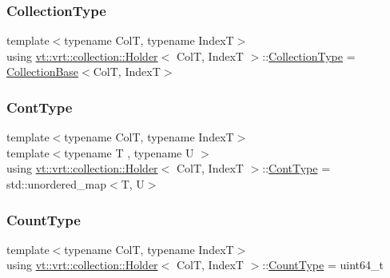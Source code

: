\subsubsection{\texorpdfstring{Collection\+Type}{CollectionType}}
{\footnotesize\ttfamily template$<$typename ColT, typename IndexT$>$ \\
using \hyperlink{structvt_1_1vrt_1_1collection_1_1_holder}{vt\+::vrt\+::collection\+::\+Holder}$<$ ColT, IndexT $>$\+::\hyperlink{structvt_1_1vrt_1_1collection_1_1_holder_a38b4a4bfc4408cf28918c32433c80aac}{Collection\+Type} =  \hyperlink{structvt_1_1vrt_1_1collection_1_1_collection_base}{Collection\+Base}$<$ColT, IndexT$>$}

\mbox{\label{structvt_1_1vrt_1_1collection_1_1_holder_ae3bb115b69cf47e14a4e8441cebe9142}} 
\subsubsection{\texorpdfstring{Cont\+Type}{ContType}}
{\footnotesize\ttfamily template$<$typename ColT, typename IndexT$>$ \\
template$<$typename T , typename U $>$ \\
using \hyperlink{structvt_1_1vrt_1_1collection_1_1_holder}{vt\+::vrt\+::collection\+::\+Holder}$<$ ColT, IndexT $>$\+::\hyperlink{structvt_1_1vrt_1_1collection_1_1_holder_ae3bb115b69cf47e14a4e8441cebe9142}{Cont\+Type} =  std\+::unordered\+\_\+map$<$T, U$>$}

\mbox{\label{structvt_1_1vrt_1_1collection_1_1_holder_a3251a556ac19fc7dc4d0bd388cfaedeb}} 
\subsubsection{\texorpdfstring{Count\+Type}{CountType}}
{\footnotesize\ttfamily template$<$typename ColT, typename IndexT$>$ \\
using \hyperlink{structvt_1_1vrt_1_1collection_1_1_holder}{vt\+::vrt\+::collection\+::\+Holder}$<$ ColT, IndexT $>$\+::\hyperlink{structvt_1_1vrt_1_1collection_1_1_holder_a3251a556ac19fc7dc4d0bd388cfaedeb}{Count\+Type} =  uint64\+\_\+t}

